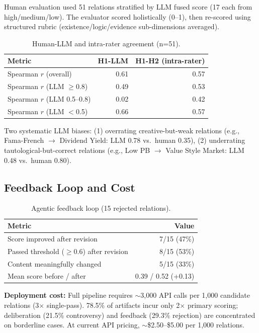 \documentclass[sigconf]{acmart}
\begin{document}
Human evaluation used 51 relations stratified by LLM fused score (17 each from high/medium/low). The evaluator scored holistically (0--1), then re-scored using structured rubric (existence/logic/evidence sub-dimensions averaged).

\begin{table}[h]
\caption{Human-LLM and intra-rater agreement (n=51).}
\label{tab:human_appendix}
\centering
\begin{tabular}{l r r}
\toprule
Metric & H1-LLM & H1-H2 (intra-rater) \\
\midrule
Spearman $r$ (overall) & 0.61 & 0.57 \\
Spearman $r$ (LLM $\ge$0.8) & 0.49 & 0.53 \\
Spearman $r$ (LLM 0.5--0.8) & 0.02 & 0.42 \\
Spearman $r$ (LLM $<$0.5) & 0.66 & 0.57 \\
\bottomrule
\end{tabular}
\end{table}

Two systematic LLM biases: (1) overrating creative-but-weak relations (e.g., Fama-French $\rightarrow$ Dividend Yield: LLM 0.78 vs.\ human 0.35), (2) underrating tautological-but-correct relations (e.g., Low PB $\rightarrow$ Value Style Market: LLM 0.48 vs.\ human 0.80).

\subsection{Feedback Loop and Cost}

\begin{table}[h]
\caption{Agentic feedback loop (15 rejected relations).}
\label{tab:feedback_appendix}
\centering
\begin{tabular}{l r}
\toprule
Metric & Value \\
\midrule
Score improved after revision & 7/15 (47\%) \\
Passed threshold ($\ge$0.6) after revision & 8/15 (53\%) \\
Content meaningfully changed & 5/15 (33\%) \\
Mean score before / after & 0.39 / 0.52 (+0.13) \\
\bottomrule
\end{tabular}
\end{table}

\textbf{Deployment cost:} Full pipeline requires $\sim$3,000 API calls per 1,000 candidate relations (3$\times$ single-pass). 78.5\% of artifacts incur only 2$\times$ primary scoring; deliberation (21.5\% controversy) and feedback (29.3\% rejection) are concentrated on borderline cases. At current API pricing, $\sim$\$2.50--\$5.00 per 1,000 relations.
\end{document}

